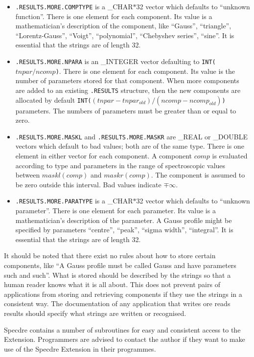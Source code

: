 \begin{itemize}
\begin{itemize}
\item{\tt .RESULTS.MORE.COMPTYPE} is a \_CHAR$*$32 vector which defaults to
``unknown function''. There is one element for each component. Its value is a
mathematician's description of the component, like ``Gauss'', ``triangle'',
``Lorentz-Gauss'', ``Voigt'', ``polynomial'', ``Chebyshev series'', ``sine''.
It is essential that the strings are of length 32.

\item{\tt .RESULTS.MORE.NPARA} is an \_INTEGER vector defaulting to
{\tt INT($tnpar/ncomp$)}. There is one element for each component. Its value is
the number of parameters stored for that component. When more components are
added to an existing {\tt .RESULTS} structure, then the new components are
allocated by default {\tt INT($(tnpar-tnpar_{old})/(ncomp-ncomp_{old})$)}
parameters. The numbers of parameters must be greater
than or equal to zero.

\item{\tt .RESULTS.MORE.MASKL} and {\tt .RESULTS.MORE.MASKR} are \_REAL or
\_DOUBLE vectors which default to bad values; both are of the same type. There
is one element in either vector for each component. A component $comp$ is
evaluated according to type and parameters in the range of spectroscopic
values between $maskl(comp)$ and $maskr(comp)$. The component is assumed to be
zero outside this interval. Bad values indicate $\mp\infty$.

\item{\tt .RESULTS.MORE.PARATYPE} is a \_CHAR$*$32 vector which defaults to
``unknown parameter''. There is one element for each parameter. Its value is a
mathematician's description of the parameter. A Gauss profile might be
specified by parameters ``centre'', ``peak'', ``sigma width'', ``integral''. It
is essential that the strings are of length 32.
\end{itemize}

It should be noted that there exist no rules about how to store certain
components, like ``A Gauss profile must be called Gauss and have parameters
such and such''. What is stored should be described by the strings so that a
human reader knows what it is all about. This does not prevent pairs of
applications from storing and retrieving components if they use the strings
in a consistent way. The documentation of any application that writes ore reads
results should specify what strings are written or recognised.
\end{itemize}

Specdre contains a number of subroutines for easy and consistent access to
the Extension. Programmers are advised to contact the author if they want to
make use of the Specdre Extension in their programmes.

